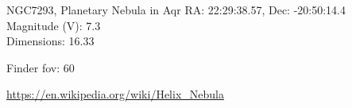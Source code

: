 \begin{block}{NGC7293, Planetary Nebula in Aqr}
    RA: 22:29:38.57, Dec: -20:50:14.4 \\ 
    Magnitude (V): 7.3 \\ 
    Dimensions: 16.33 

    Finder fov: 60 

    \url{https://en.wikipedia.org/wiki/Helix_Nebula} 
\end{block}